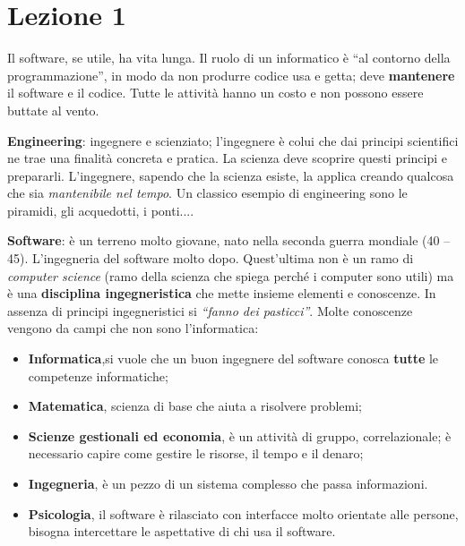 





\section{Lezione 1}


Il software, se utile, ha vita lunga.
Il ruolo di un informatico è ``al contorno della programmazione'', in modo da non produrre codice usa e getta; deve \textbf{mantenere} il software e il codice. Tutte le attività hanno un costo e non possono essere buttate al vento.

\textbf{Engineering}: ingegnere e scienziato; l'ingegnere è colui che dai principi scientifici ne trae una finalità concreta e pratica. La scienza deve scoprire questi principi e prepararli. L'ingegnere, sapendo che la scienza esiste, la applica creando qualcosa che sia \textit{mantenibile nel tempo}. Un classico esempio di engineering sono le piramidi, gli acquedotti, i ponti....

\textbf{Software}: è un terreno molto giovane, nato nella seconda guerra mondiale (40 – 45). L'ingegneria del software molto dopo. Quest'ultima non è un ramo di \textit{computer science} (ramo della scienza che spiega perché i computer sono utili) ma è una \textbf{disciplina ingegneristica} che mette insieme elementi e conoscenze. In assenza di principi ingegneristici si \textit{``fanno dei pasticci''}. Molte conoscenze vengono da campi che non sono l'informatica:

\begin{itemize}

	\item \textbf{Informatica},si vuole che un buon ingegnere del software conosca \textbf{tutte} le competenze informatiche;
	\item \textbf{Matematica}, scienza di base che aiuta a risolvere problemi;
	\item \textbf{Scienze gestionali ed economia}, è un attività di gruppo, correlazionale; è necessario capire come gestire le risorse, il tempo e il denaro;
	\item \textbf{Ingegneria}, è un pezzo di un sistema complesso che passa informazioni.
	\item \textbf{Psicologia}, il software è rilasciato con interfacce molto orientate alle persone, bisogna intercettare le aspettative di chi usa il software.

\end{itemize}

